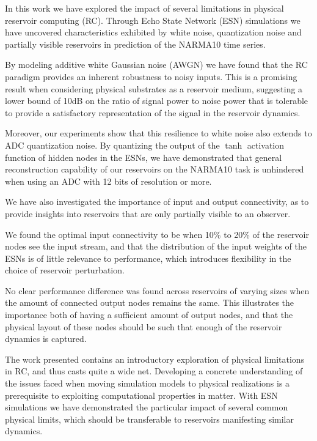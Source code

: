 In this work we have explored the impact of several limitations in physical
reservoir computing (RC). Through Echo State Network (ESN) simulations we have
uncovered characteristics exhibited by white noise, quantization noise and
partially visible reservoirs in prediction of the NARMA10 time series.

By modeling additive white Gaussian noise (AWGN) we have found that the RC
paradigm provides an inherent robustness to noisy inputs. This is a promising
result when considering physical substrates as a reservoir medium, suggesting a
lower bound of 10dB on the ratio of signal power to noise power that is
tolerable to provide a satisfactory representation of the signal in the
reservoir dynamics.

Moreover, our experiments show that this resilience to white noise also extends
to ADC quantization noise. By quantizing the output of the $\tanh$ activation
function of hidden nodes in the ESNs, we have demonstrated that general
reconstruction capability of our reservoirs on the NARMA10 task is unhindered
when using an ADC with 12 bits of resolution or more.

We have also investigated the importance of input and output connectivity, as to
provide insights into reservoirs that are only partially visible to an
observer.

We found the optimal input connectivity to be when 10\% to 20\% of the reservoir
nodes see the input stream, and that the distribution of the input weights of
the ESNs is of little relevance to performance, which introduces flexibility in
the choice of reservoir perturbation.

No clear performance difference was found across reservoirs of varying sizes
when the amount of connected output nodes remains the same. This illustrates the
importance both of having a sufficient amount of output nodes, and that the
physical layout of these nodes should be such that enough of the reservoir
dynamics is captured.

The work presented contains an introductory exploration of physical limitations
in RC, and thus casts quite a wide net. Developing a concrete understanding of
the issues faced when moving simulation models to physical realizations is a
prerequisite to exploiting computational properties in matter. With ESN
simulations we have demonstrated the particular impact of several common
physical limits, which should be transferable to reservoirs manifesting similar
dynamics.

